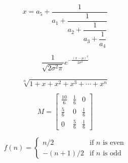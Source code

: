 \documentclass[20pt,a4paper]{extarticle}
\begin{document}
    \begin{equation}
        {\displaystyle x = a_5+\dfrac{1}{a_1+\dfrac{1}{a_2+\dfrac{1}{a_3+\dfrac{1}{a_4}}}}}
    \end{equation}

    \begin{equation}
        {\displaystyle \dfrac{1}{\sqrt{2\sigma^2\pi}}e^{-\frac{\left(x-\mu\right)^2}{2\sigma^2}}}
    \end{equation}

    \begin{equation}
        {\displaystyle \sqrt[n]{1+x+x^2+x^3+\cdots+x^n}}
    \end{equation}
    
    \begin{equation}
        M =
        \begin{bmatrix}
            \tfrac{10}{6} & \tfrac{1}{6} & 0 \\ 
            \tfrac{5}{6} & 0 & \tfrac{1}{6} \\
            0 & \tfrac{5}{6} & \tfrac{1}{6}
        \end{bmatrix}
    \end{equation}

    \begin{equation}
        f\left(n\right) = 
        \begin{cases}
            n/2 & \text{if }n\text{ is even} \\
            -\left(n+1\right)/2 & \text{if }n\text{ is odd}
        \end{cases}
    \end{equation}
    
\end{document}
